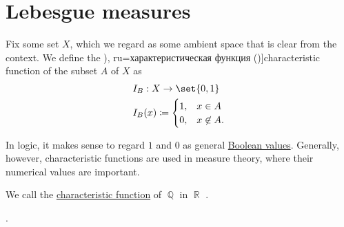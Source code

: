 \section{Lebesgue measures}\label{sec:lebesgue_measures}

\begin{definition}\label{def:subset_characteristic_function}
  Fix some set \( X \), which we regard as some ambient space that is clear from the context. We define the \term[bg=характеристична функция (\cite[exerc. 4.1]{Драганов2022ТеорияНаМярката}), ru=характеристическая функция (\cite[131]{Богачёв2003ОсновыТеорииМерыТом1})]{characteristic function} of the subset \( A \) of \( X \) as
  \begin{equation}\label{eq:def:dirichlet_function}
    \begin{aligned}
      &I_B: X \to \set{ 0, 1 } \\
      &I_B(x) \coloneqq \begin{cases}
        1, &x \in A \\
        0, &x \not\in A.
      \end{cases}
    \end{aligned}
  \end{equation}
\end{definition}
\begin{comments}
  \item In logic, it makes sense to regard \( 1 \) and \( 0 \) as general \hyperref[def:boolean_value]{Boolean values}. Generally, however, characteristic functions are used in measure theory, where their numerical values are important.
\end{comments}

\begin{definition}\label{def:dirichlet_function}
  We call the \hyperref[def:subset_characteristic_function]{characteristic function} of \( \BbbQ \) in \( \BbbR \) .
\end{definition}

\begin{definition}\label{def:lebesgue_measure}
  .
\end{definition}
